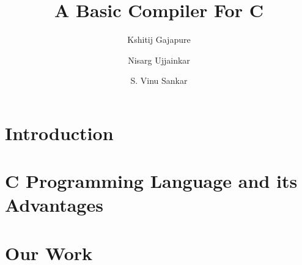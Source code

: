 \documentclass{clv3}
\begin{document}
    \title{A Basic Compiler For C}
    \author{Kshitij Gajapure}

    \author{Nisarg Ujjainkar}

    \author{S. Vinu Sankar}
    \maketitle
    \section{Introduction}
    
    \section{C Programming Language and its Advantages}
    
    \section{Our Work}
    
\end{document}
